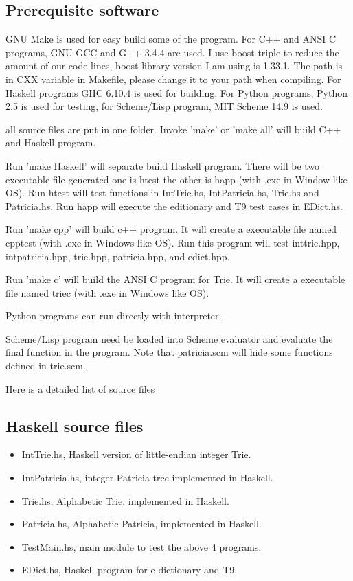 \documentclass{article}
\begin{document}
\subsection{Prerequisite software}
GNU Make is used for easy build some of the program. For C++ and ANSI C programs,
GNU GCC and G++ 3.4.4 are used. I use boost triple to reduce the
amount of our code lines, boost library version I am using is
1.33.1. The path is in CXX variable in Makefile, please change it to
your path when compiling.
For Haskell programs GHC 6.10.4 is used
for building. For Python programs, Python 2.5 is used for testing, for
Scheme/Lisp program, MIT Scheme 14.9 is used.

all source files are put in one folder. Invoke 'make' or 'make all'
will build C++ and Haskell program. 

Run 'make Haskell' will separate build Haskell program. There will be
two executable file generated one is htest the other is happ (with .exe
in Window like OS). Run htest will test functions in IntTrie.hs, IntPatricia.hs,
Trie.hs and Patricia.hs. Run happ will execute the editionary and T9
test cases in EDict.hs.

Run 'make cpp' will build c++ program. It will create a executable
file named cpptest (with .exe in Windows like OS). Run this program
will test inttrie.hpp, intpatricia.hpp, trie.hpp, patricia.hpp, and
edict.hpp. 

Run 'make c' will build the ANSI C program for Trie. It will create a
executable file named triec (with .exe in Windows like OS).

Python programs can run directly with interpreter. 

Scheme/Lisp program need be loaded into Scheme evaluator and evaluate
the final function in the program. Note that patricia.scm will hide
some functions defined in trie.scm.

Here is a detailed list of source files

\subsection{Haskell source files}

\begin{itemize}
\item IntTrie.hs, Haskell version of little-endian integer Trie.
\item IntPatricia.hs, integer Patricia tree implemented in Haskell.
\item Trie.hs, Alphabetic Trie, implemented in Haskell.
\item Patricia.hs, Alphabetic Patricia, implemented in Haskell.
\item TestMain.hs, main module to test the above 4 programs.
\item EDict.hs, Haskell program for e-dictionary and T9.
\end{itemize}
\end{document}
